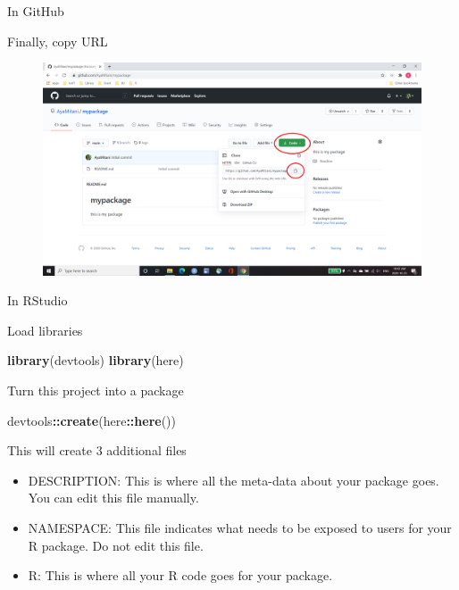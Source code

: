 \documentclass[
  ignorenonframetext,
]{beamer}
\newenvironment{Shaded}{\begin{snugshade}}{\end{snugshade}}
\newcommand{\KeywordTok}[1]{\textcolor[rgb]{0.13,0.29,0.53}{\textbf{#1}}}
\newcommand{\NormalTok}[1]{#1}
\newcommand{\OperatorTok}[1]{\textcolor[rgb]{0.81,0.36,0.00}{\textbf{#1}}}
\providecommand{\tightlist}{%
  \setlength{\itemsep}{0pt}\setlength{\parskip}{0pt}}
\begin{document}
\begin{frame}{In GitHub}
\protect\hypertarget{in-github-3}{}

Finally, copy URL

\begin{figure}
  \includegraphics[scale=0.275]{slides_files/figure-beamer/GitHub_step5.png}
\end{figure}

\end{frame}

\begin{frame}[fragile]{In RStudio}
\protect\hypertarget{in-rstudio}{}

Load libraries

\begin{Shaded}
\begin{Highlighting}[]
\KeywordTok{library}\NormalTok{(devtools)}
\KeywordTok{library}\NormalTok{(here)}
\end{Highlighting}
\end{Shaded}

\end{frame}

\begin{frame}[fragile]{Turn this project into a package}
\protect\hypertarget{turn-this-project-into-a-package}{}

\begin{Shaded}
\begin{Highlighting}[]
\NormalTok{devtools}\OperatorTok{::}\KeywordTok{create}\NormalTok{(here}\OperatorTok{::}\KeywordTok{here}\NormalTok{())}
\end{Highlighting}
\end{Shaded}

This will create 3 additional files

\begin{itemize}
\tightlist
\item
  DESCRIPTION: This is where all the meta-data about your package goes.
  You can edit this file manually.
\item
  NAMESPACE: This file indicates what needs to be exposed to users for
  your R package. Do not edit this file.
\item
  R: This is where all your R code goes for your package.
\end{itemize}

\end{frame}
\end{document}
